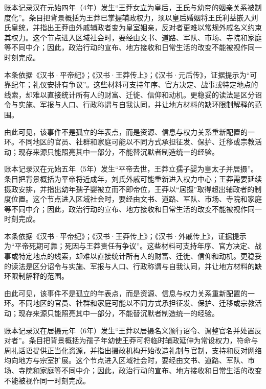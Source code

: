 账本记录汉在元始四年（4年）发生“王莽女立为皇后，王氏与幼帝的姻亲关系被制度化”。条目把背景概括为王莽已掌握辅政权力，须以皇后婚姻将王氏利益嵌入刘氏皇统，并指出王莽由外戚辅政者变为皇室姻亲，反对者更难以常规外戚名义约束其权力。这个节点进入区域社会时，要经由文书、道路、军队、市场、寺院和家庭等不同中介；因此，政治行动的宣布、地方接收和日常生活的改变不能被视作同一时刻完成。

本条依据《汉书·平帝纪》；《汉书·王莽传上》；《汉书·元后传》，证据提示为“可靠纪年；礼仪安排有争议”。这些材料可支持年序、官方决定、战事或特定地点的线索，却难以直接统计所有人的财富、迁徙、信仰和动机。更稳妥的读法是区分诏令与实施、军报与人口、行政称谓与自我认同，并让地方材料的缺环限制解释的范围。

由此可见，该事件不是孤立的年表点，而是资源、信息与权力关系重新配置的一环。不同地区的官员、社群和家庭可能以不同方式承担征发、保护、迁移或宗教活动；现存来源只能照亮其中一部分，不能替沉默者制造统一的经验。

账本记录汉在元始五年（5年）发生“平帝去世，王莽立孺子婴为皇太子并居摄”。条目把背景概括为平帝将近成年，刘氏外戚可能重新进入权力中心；王莽需要延续摄政安排，并指出幼年孺子婴被立而不即帝位，王莽以“居摄”取得超出辅政者的制度位置。这个节点进入区域社会时，要经由文书、道路、军队、市场、寺院和家庭等不同中介；因此，政治行动的宣布、地方接收和日常生活的改变不能被视作同一时刻完成。

本条依据《汉书·平帝纪》；《汉书·王莽传上》；《汉书·外戚传上》，证据提示为“平帝死期可靠；死因与王莽责任有争议”。这些材料可支持年序、官方决定、战事或特定地点的线索，却难以直接统计所有人的财富、迁徙、信仰和动机。更稳妥的读法是区分诏令与实施、军报与人口、行政称谓与自我认同，并让地方材料的缺环限制解释的范围。

由此可见，该事件不是孤立的年表点，而是资源、信息与权力关系重新配置的一环。不同地区的官员、社群和家庭可能以不同方式承担征发、保护、迁移或宗教活动；现存来源只能照亮其中一部分，不能替沉默者制造统一的经验。

账本记录汉在居摄元年（6年）发生“王莽以居摄名义颁行诏令、调整官名并处置反对者”。条目把背景概括为孺子年幼使王莽可将临时辅政延伸为常设权力，符命与周礼话语提供正当化资源，并指出摄政机构开始改造礼制与官制，支持和反对网络均向地方与宗室扩展。这个节点进入区域社会时，要经由文书、道路、军队、市场、寺院和家庭等不同中介；因此，政治行动的宣布、地方接收和日常生活的改变不能被视作同一时刻完成。

